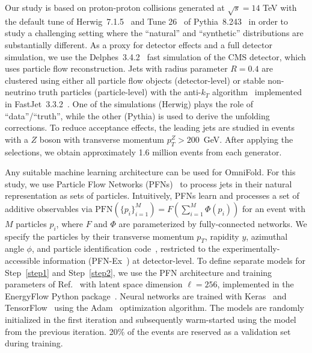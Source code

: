 \documentclass[prl,twocolumn,superscriptaddress,longbibliography,preprintnumbers,nofootinbib]{revtex4-1}
\DeclareRobustCommand{\Ref}[1]{Ref.~\cite{#1}}
\newcommand{\Pythia}{{\sc Pythia}\xspace}
\newcommand{\Herwig}{{\sc Herwig}\xspace}
\newcommand{\FastJet}{{\sc FastJet}\xspace}
\newcommand{\Delphes}{{\sc Delphes}\xspace}
\newcommand{\OmniFold}{{\sc OmniFold}\xspace}
\newcommand{\EnergyFlow}{{\sc EnergyFlow}\xspace}
\begin{document}
Our study is based on proton-proton collisions generated at $\sqrt{s}=14$ TeV with the default tune of \Herwig~7.1.5~\cite{Bahr:2008pv,Bellm:2015jjp,Bellm:2017bvx} and Tune 26~\cite{ATL-PHYS-PUB-2014-021} of \Pythia~8.243~\cite{Sjostrand:2007gs,Sjostrand:2006za,Sjostrand:2014zea} in order to study a challenging setting where the ``natural'' and ``synthetic'' distributions are substantially different.
%
As a proxy for detector effects and a full detector simulation, we use the \Delphes~3.4.2~\cite{deFavereau:2013fsa} fast simulation of the CMS detector, which uses particle flow reconstruction.
%
Jets with radius parameter $R=0.4$ are clustered using either all particle flow objects (detector-level) or stable non-neutrino truth particles (particle-level) with the anti-$k_T$ algorithm~\cite{Cacciari:2008gp} implemented in \FastJet~3.3.2~\cite{Cacciari:2011ma,Cacciari:2005hq}.
%
One of the simulations (\Herwig) plays the role of ``data''/``truth'', while the other (\Pythia) is used to derive the unfolding corrections.
%
To reduce acceptance effects, the leading jets are studied in events with a $Z$ boson with transverse momentum $p_T^Z>200$~GeV.
%
After applying the selections, we obtain approximately 1.6 million events from each generator.



Any suitable machine learning architecture can be used for \OmniFold.
%
For this study, we use Particle Flow Networks (PFNs)~\cite{Komiske:2018cqr,DBLP:conf/nips/ZaheerKRPSS17} to process jets in their natural representation as sets of particles.
%
Intuitively, PFNs learn and processes a set of additive observables via $\text{PFN}(\{p_i\}_{i=1}^M) = F\left(\sum_{i=1}^M \Phi(p_i)\right)$ for an event with $M$ particles $p_i$, where $F$ and $\Phi$ are parameterized by fully-connected networks.
%
We specify the particles by their transverse momentum $p_T$, rapidity $y$, azimuthal angle $\phi$, and particle identification code~\cite{Tanabashi:2018oca}, restricted to the experimentally-accessible information (PFN-Ex~\cite{Komiske:2018cqr}) at detector-level.
%
To define separate models for Step~\ref{step1} and Step~\ref{step2}, we use the PFN architecture and training parameters of \Ref{Komiske:2018cqr} with latent space dimension $\ell = 256$, implemented in the \EnergyFlow Python package~\cite{EnergyFlow}.
%
Neural networks are trained with Keras~\cite{keras} and TensorFlow~\cite{tensorflow} using the Adam~\cite{adam} optimization algorithm.
%
The models are randomly initialized in the first iteration and subsequently warm-started using the model from the previous iteration.
%
20\% of the events are reserved as a validation set during training.
\end{document}
